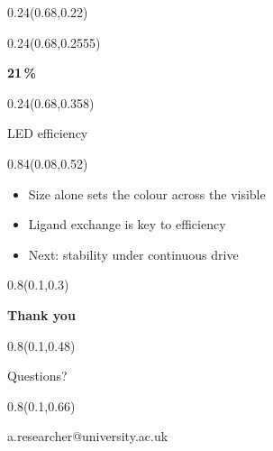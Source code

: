 \documentclass[aspectratio=169]{beamer}
\begin{document}
\begin{frame}[t]
%
\begin{textblock}{0.24}(0.68,0.22)
\end{textblock}

\begin{textblock}{0.24}(0.68,0.2555)
{\centering\fontsize{30}{36}\selectfont \textcolor[HTML]{FFFFFF}{\textbf{21\,\%}}\par}
\end{textblock}

\begin{textblock}{0.24}(0.68,0.358)
{\centering\fontsize{12}{14}\selectfont \textcolor[HTML]{FFFFFF}{LED efficiency}\par}
\end{textblock}

\begin{textblock}{0.84}(0.08,0.52)
{\raggedright\fontsize{17}{20}\selectfont \begin{itemize}
\item Size alone sets the colour across the visible
\item Ligand exchange is key to efficiency
\item Next: stability under continuous drive
\end{itemize}\par}
\end{textblock}
\end{frame}

\begin{frame}[t]

\begin{textblock}{0.8}(0.1,0.3)
{\centering\fontsize{40}{48}\selectfont \textcolor[HTML]{003E74}{\textbf{Thank you}}\par}
\end{textblock}

\begin{textblock}{0.8}(0.1,0.48)
{\centering\fontsize{22}{26}\selectfont \textcolor[HTML]{555555}{Questions?}\par}
\end{textblock}

\begin{textblock}{0.8}(0.1,0.66)
{\centering\fontsize{14}{17}\selectfont \textcolor[HTML]{0091D4}{a.researcher@university.ac.uk}\par}
\end{textblock}
\end{frame}
\end{document}
